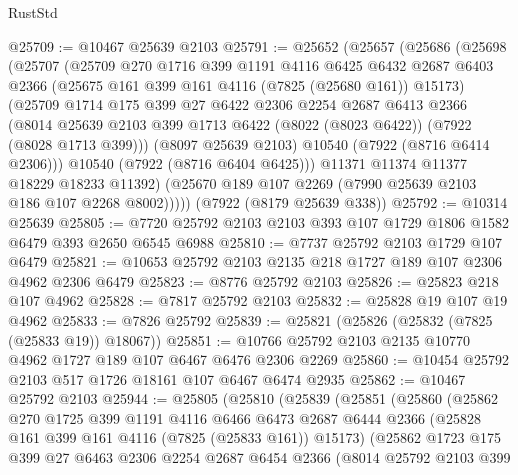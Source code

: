 \begin{lexlean}{RustStd}
\begin{coremodule}
@25709 := @10467 @25639 @2103
@25791 := @25652
    (@25657
      (@25686
        (@25698
          (@25707
            (@25709
              @270
              @1716
              @399
              @1191
              @4116
              @6425
              @6432
              @2687
              @6403
              @2366
              (@25675 @161 @399 @161 @4116 (@7825 (@25680 @161)) @15173)
              (@25709
                @1714
                @175
                @399
                @27
                @6422
                @2306
                @2254
                @2687
                @6413
                @2366
                (@8014
                  @25639
                  @2103
                  @399
                  @1713
                  @6422
                  (@8022 (@8023 @6422))
                  (@7922 (@8028 @1713 @399)))
                (@8097 @25639 @2103)
                @10540
                (@7922 (@8716 @6414 @2306)))
              @10540
              (@7922 (@8716 @6404 @6425)))
            @11371
            @11374
            @11377
            @18229
            @18233
            @11392)
          (@25670 @189 @107 @2269 (@7990 @25639 @2103 @186 @107 @2268 @8002)))))
    (@7922 (@8179 @25639 @338))
@25792 := @10314 @25639
@25805 := @7720 @25792 @2103 @2103 @393 @107 @1729 @1806 @1582 @6479 @393 @2650 @6545 @6988
@25810 := @7737 @25792 @2103 @1729 @107 @6479
@25821 := @10653 @25792 @2103 @2135 @218 @1727 @189 @107 @2306 @4962 @2306 @6479
@25823 := @8776 @25792 @2103
@25826 := @25823 @218 @107 @4962
@25828 := @7817 @25792 @2103
@25832 := @25828 @19 @107 @19 @4962
@25833 := @7826 @25792
@25839 := @25821 (@25826 (@25832 (@7825 (@25833 @19)) @18067))
@25851 := @10766 @25792 @2103 @2135 @10770 @4962 @1727 @189 @107 @6467 @6476 @2306 @2269
@25860 := @10454 @25792 @2103 @517 @1726 @18161 @107 @6467 @6474 @2935
@25862 := @10467 @25792 @2103
@25944 := @25805
    (@25810
      (@25839
        (@25851
          (@25860
            (@25862
              @270
              @1725
              @399
              @1191
              @4116
              @6466
              @6473
              @2687
              @6444
              @2366
              (@25828 @161 @399 @161 @4116 (@7825 (@25833 @161)) @15173)
              (@25862
                @1723
                @175
                @399
                @27
                @6463
                @2306
                @2254
                @2687
                @6454
                @2366
                (@8014
                  @25792
                  @2103
                  @399

\end{coremodule}
\end{lexlean}
